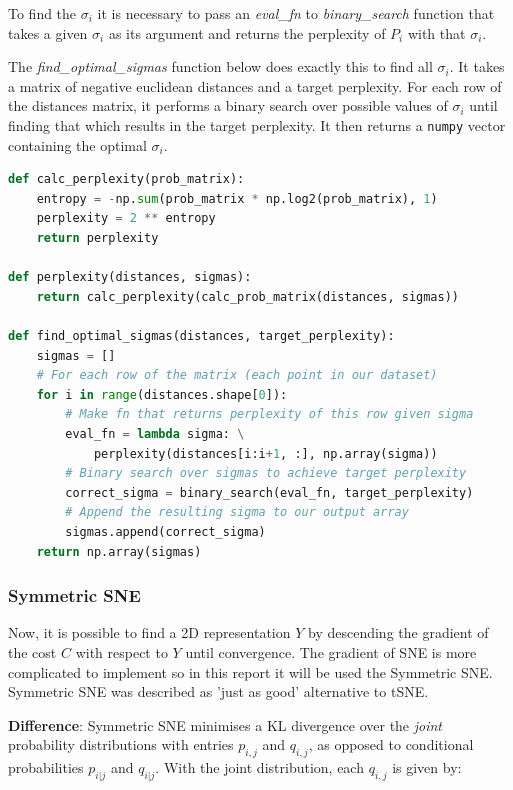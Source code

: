 To find the $\sigma_i$ it is necessary to pass an \emph{eval\_fn} to \emph{binary\_search} function that takes a given $\sigma_i$ as its argument and returns the perplexity of $P_i$ with that $\sigma_i$.


The \emph{find\_optimal\_sigmas} function below does exactly this to find all $\sigma_i$. It takes a matrix of negative euclidean distances and a target perplexity. For each row of the distances matrix, it performs a binary search over possible values of $\sigma_i$ until finding that which results in the target perplexity. It then returns a \texttt{numpy} vector containing the optimal $\sigma_i$.

\begin{lstlisting}[language=Python]
def calc_perplexity(prob_matrix):
    entropy = -np.sum(prob_matrix * np.log2(prob_matrix), 1)
    perplexity = 2 ** entropy
    return perplexity

def perplexity(distances, sigmas):
    return calc_perplexity(calc_prob_matrix(distances, sigmas))

def find_optimal_sigmas(distances, target_perplexity):
    sigmas = [] 
    # For each row of the matrix (each point in our dataset)
    for i in range(distances.shape[0]):
        # Make fn that returns perplexity of this row given sigma
        eval_fn = lambda sigma: \
            perplexity(distances[i:i+1, :], np.array(sigma))
        # Binary search over sigmas to achieve target perplexity
        correct_sigma = binary_search(eval_fn, target_perplexity)
        # Append the resulting sigma to our output array
        sigmas.append(correct_sigma)
    return np.array(sigmas)
\end{lstlisting}

\subsubsection{Symmetric SNE}

Now, it is possible to find a 2D representation $Y$ by descending the gradient of the cost $C$ with respect to $Y$ until convergence. The gradient of SNE is more complicated to implement so in this report it will be used the Symmetric SNE. Symmetric SNE was described as 'just as good' alternative to tSNE.

\textbf{Difference}: Symmetric SNE minimises a KL divergence over the \emph{joint} probability distributions with entries $p_{i,j}$ and $q_{i,j}$, as opposed to conditional probabilities $p_{i|j}$ and $q_{i|j}$. With the joint distribution, each $q_{i,j}$ is given by:

